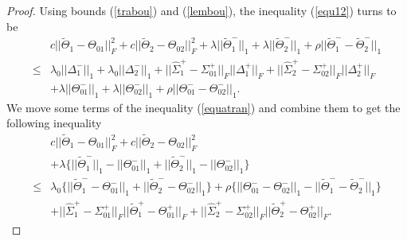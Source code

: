 \documentclass[review]{elsarticle}
\newcommand{\1}{{\bf 1}}
\newcommand{\0}{{\bf 0}}
\newtheorem{proof}{Proof}
\begin{document}
\begin{appendices}
\begin{proof}
 Using bounds (\ref{trabou}) and (\ref{lembou}), the inequality (\ref{equ12}) turns to be
\begin{equation}\label{equatran}
\begin{aligned}
&c||\widetilde{\Theta}_1-\Theta_{01}||_{F}^{2}+
c||\widetilde{\Theta}_2-\Theta_{02}||_{F}^{2}+
\lambda||\widetilde{\Theta}_1^{-}||_1+
\lambda||\widetilde{\Theta}_2^{-}||_1+
\rho||\widetilde{\Theta}_1^{-}-\widetilde{\Theta}_2^{-}||_1\\
\leq &\lambda_0||\Delta_1^{-}||_1+\lambda_0||\Delta_2^{-}||_1
+||\widehat{\Sigma}_{1}^{+}-\Sigma_{01}^{+}||_F||\Delta_1^{+}||_{F}
+||\widehat{\Sigma}_{2}^{+}-\Sigma_{02}^{+}||_F||\Delta_2^{+}||_{F}\\
&+\lambda||\Theta_{01}^{-}||_1+\lambda||\Theta_{02}^{-}||_1
+\rho||\Theta_{01}^{-}-\Theta_{02}^{-}||_1.
\end{aligned}
\end{equation}
 We move some terms of the inequality (\ref{equatran}) and combine them to get the following inequality
\begin{equation}\label{equa3needpro}
\begin{split}
&c||\widetilde{\Theta}_1-\Theta_{01}||_{F}^{2}+c||\widetilde{\Theta}_2-\Theta_{02}||_{F}^{2} \\
&+\lambda\Big\{||\widetilde{\Theta}_1^{-}||_1-||\Theta_{01}^{-}||_1+||\widetilde{\Theta}_2^{-}||_1-||\Theta_{02}^{-}||_1\Big\}
\\
\leq &\lambda_0\Big\{||\widetilde{\Theta}_1^{-}-\Theta_{01}^{-}||_1+||\widetilde{\Theta}_2^{-}-\Theta_{02}^{-}||_1\Big\}
+\rho\Big\{||\Theta_{01}^{-}-\Theta_{02}^{-}||_1-||\widetilde{\Theta}_1^{-}-\widetilde{\Theta}_2^{-}||_1\Big\}\\
&+||\widehat{\Sigma}_{1}^{+}-\Sigma_{01}^{+}||_F||\widetilde{\Theta}_1^{+}-\Theta_{01}^{+}||_{F}
+||\widehat{\Sigma}_{2}^{+}-\Sigma_{02}^{+}||_F||\widetilde{\Theta}_2^{+}-\Theta_{02}^{+}||_{F}.
\end{split}
\end{equation}


\end{proof}
\end{appendices}
\end{document}
